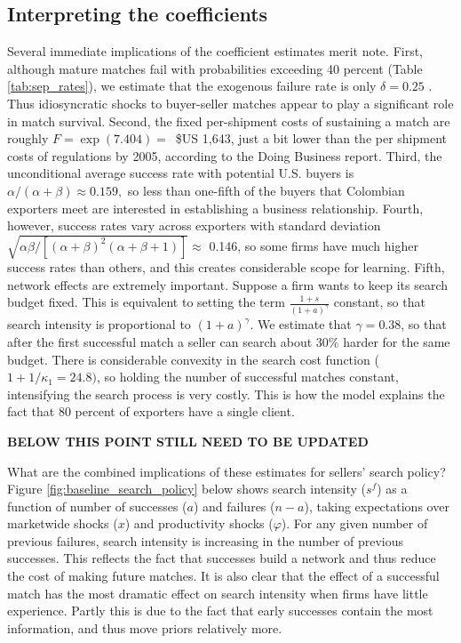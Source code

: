 \documentclass[12pt,titlepage]{article}
\begin{document}
\subsection{Interpreting the coefficients}

Several immediate implications of the coefficient estimates merit note.
First, although mature matches fail with probabilities exceeding 40 percent
(Table \ref{tab:sep_rates}), we estimate that the exogenous failure rate is only $\delta =0.25$%
. Thus idiosyncratic shocks to buyer-seller matches appear to play a
significant role in match survival. Second, the fixed per-shipment costs of
sustaining a match are roughly $F=\exp (7.404)=$\ \$US 1,643, just a bit 
lower than the per shipment costs of regulations by 2005, according to the
Doing Business report. Third, the unconditional average success rate with
potential U.S. buyers is \ $\alpha /(\alpha +\beta )\approx 0.159,$ so less
than one-fifth of the buyers that Colombian exporters meet are interested in
establishing a business relationship. Fourth, however, success rates vary
across exporters with standard deviation\ $\sqrt{\alpha \beta /\left[
(\alpha +\beta )^{2}(\alpha +\beta +1)\right] }\approx $ 0.146, so some
firms have much higher success rates than others, and this creates
considerable scope for learning. Fifth, network effects are extremely
important. Suppose a firm wants to keep its search budget fixed.  This is equivalent to setting the term $\frac{1+s}{(1+a)^\gamma}$ constant, so that search intensity is proportional to $(1+a)^\gamma$.  We estimate that $\gamma = 0.38$, so that after the first successful match
a seller can search about 30\% harder for the same budget. There is considerable convexity in the
search cost function ($1+1/\kappa _{1}=24.8)$, so holding the number of
successful matches constant, intensifying the search process is very costly.
This is how the model explains the fact that 80 percent of exporters have a
single client.

\textbf{BELOW THIS POINT STILL NEED TO BE UPDATED}

What are the combined implications of these estimates for sellers' search
policy? Figure \ref{fig:baseline_search_policy} below shows search intensity
($s^{f}$) as a function of number of successes ($a$) and failures ($n-a$),
taking expectations over marketwide shocks ($x$) and productivity shocks ($%
\varphi $). For any given number of previous failures, search intensity is
increasing in the number of previous successes. This reflects the fact that
successes build a network and thus reduce the cost of making future matches.
It is also clear that the effect of a successful match has the most dramatic
effect on search intensity when firms have little experience. Partly this is
due to the fact that early successes contain the most information, and thus
move priors relatively more.
\end{document}
